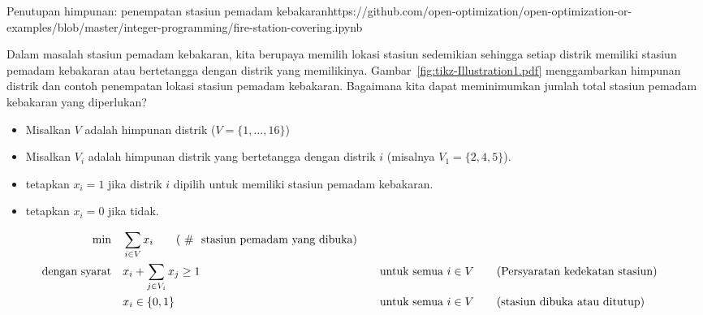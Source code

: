 \begin{examplewithcode}{Penutupan himpunan: penempatan stasiun pemadam kebakaran}{https://github.com/open-optimization/open-optimization-or-examples/blob/master/integer-programming/fire-station-covering.ipynb}
\label{example:fire-station}

Dalam masalah stasiun pemadam kebakaran, kita berupaya memilih lokasi stasiun sedemikian sehingga setiap distrik memiliki stasiun pemadam kebakaran atau bertetangga dengan distrik yang memilikinya. Gambar~\ref{fig:tikz-Illustration1.pdf} menggambarkan himpunan distrik dan contoh penempatan lokasi stasiun pemadam kebakaran. Bagaimana kita dapat meminimumkan jumlah total stasiun pemadam kebakaran yang diperlukan?


\begin{itemize}
\item Misalkan $V$ adalah himpunan distrik ($V = \{1, \dots, 16\}$)
\item Misalkan $V_i$ adalah himpunan distrik yang bertetangga dengan distrik $i$ (misalnya $V_1 = \{2,4,5\}$).
\end{itemize}

\begin{itemize}
\item tetapkan $x_i = 1$ jika distrik $i$ dipilih untuk memiliki stasiun pemadam kebakaran.
\item tetapkan $x_i = 0$ jika tidak.
\end{itemize}
\begin{align}
\min \quad & \sum_{i \in V} x_i \tag{ \# \text{ stasiun pemadam yang dibuka}} \\
\st        & x_i + \sum_{j \in V_i} x_j \geq 1 &&\quad \text{untuk semua } {i \in V}   \tag{Persyaratan kedekatan stasiun} \\
& x_i \in \{0,1\} &&\quad \text{untuk semua } i\in V   \tag{stasiun dibuka atau ditutup}
\end{align}
\end{examplewithcode}


